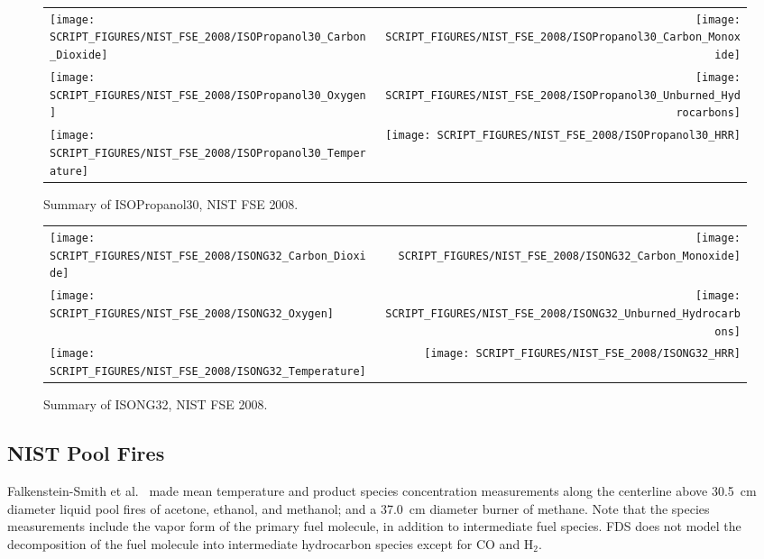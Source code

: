 \begin{figure}[p]
\begin{tabular*}{\textwidth}{l@{\extracolsep{\fill}}r}
\texttt{[image: SCRIPT\_FIGURES/NIST\_FSE\_2008/ISOPropanol30\_Carbon\_Dioxide]} &
\texttt{[image: SCRIPT\_FIGURES/NIST\_FSE\_2008/ISOPropanol30\_Carbon\_Monoxide]} \\
\texttt{[image: SCRIPT\_FIGURES/NIST\_FSE\_2008/ISOPropanol30\_Oxygen]} &
\texttt{[image: SCRIPT\_FIGURES/NIST\_FSE\_2008/ISOPropanol30\_Unburned\_Hydrocarbons]} \\
\texttt{[image: SCRIPT\_FIGURES/NIST\_FSE\_2008/ISOPropanol30\_Temperature]} &
\texttt{[image: SCRIPT\_FIGURES/NIST\_FSE\_2008/ISOPropanol30\_HRR]}
\end{tabular*}
\caption[Summary of ISOPropanol30, NIST FSE 2008]{Summary of ISOPropanol30, NIST FSE 2008.}
\label{NIST_FSE_1994_ISOPropanol30}
\end{figure}

\begin{figure}[p]
\begin{tabular*}{\textwidth}{l@{\extracolsep{\fill}}r}
\texttt{[image: SCRIPT\_FIGURES/NIST\_FSE\_2008/ISONG32\_Carbon\_Dioxide]} &
\texttt{[image: SCRIPT\_FIGURES/NIST\_FSE\_2008/ISONG32\_Carbon\_Monoxide]} \\
\texttt{[image: SCRIPT\_FIGURES/NIST\_FSE\_2008/ISONG32\_Oxygen]} &
\texttt{[image: SCRIPT\_FIGURES/NIST\_FSE\_2008/ISONG32\_Unburned\_Hydrocarbons]} \\
\texttt{[image: SCRIPT\_FIGURES/NIST\_FSE\_2008/ISONG32\_Temperature]} &
\texttt{[image: SCRIPT\_FIGURES/NIST\_FSE\_2008/ISONG32\_HRR]}
\end{tabular*}
\caption[Summary of ISONG32, NIST FSE 2008]{Summary of ISONG32, NIST FSE 2008.}
\label{NIST_FSE_1994_ISONG32}
\end{figure}


\clearpage

\subsection{NIST Pool Fires}
\label{sec:NIST_Pool_Fires}

Falkenstein-Smith et al.~\cite{Falkenstein-Smith:2019} made mean temperature and product species concentration measurements along the centerline above 30.5~cm diameter liquid pool fires of acetone, ethanol, and methanol; and a 37.0~cm diameter burner of methane. Note that the species measurements include the vapor form of the primary fuel molecule, in addition to intermediate fuel species. FDS does not model the decomposition of the fuel molecule into intermediate hydrocarbon species except for CO and H$_2$.

